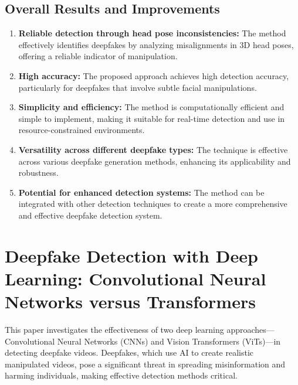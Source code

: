 \documentclass{report}
\begin{document}
	\section{Overall Results and Improvements}
	\begin{enumerate}
		\item 
		\textbf{Reliable detection through head pose inconsistencies:} The method effectively identifies deepfakes by analyzing misalignments in 3D head poses, offering a reliable indicator of manipulation.
		
		\item 
		\textbf{High accuracy:} The proposed approach achieves high detection accuracy, particularly for deepfakes that involve subtle facial manipulations.
		
		\item 
		\textbf{Simplicity and efficiency:} The method is computationally efficient and simple to implement, making it suitable for real-time detection and use in resource-constrained environments.
		
		\item 
		\textbf{Versatility across different deepfake types:} The technique is effective across various deepfake generation methods, enhancing its applicability and robustness.
		
		\item 
		\textbf{Potential for enhanced detection systems:} The method can be integrated with other detection techniques to create a more comprehensive and effective deepfake detection system.
	\end{enumerate}
	
	
	
	
	
	
	
	
	
	
	
	
	
	
	
	
	
	
	\chapter{Deepfake Detection with Deep Learning: Convolutional Neural Networks versus Transformers \cite{thing2023deepfakedetectiondeeplearning}}
	
	This paper investigates the effectiveness of two deep learning approaches—Convolutional Neural Networks (CNNs) and Vision Transformers (ViTs)—in detecting deepfake videos. Deepfakes, which use AI to create realistic manipulated videos, pose a significant threat in spreading misinformation and harming individuals, making effective detection methods critical.
	
\end{document}
